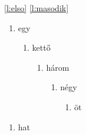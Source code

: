 \documentclass{article}
\begin{document}
\ref{l:elso}
\ref{l:masodik}

\begin{enumerate}
\item[\textbullet] egy
\label{l:elso}
\begin{enumerate}[label=\alph*]
\item kettő
\label{l:masodik}
\begin{enumerate}
\item három
\begin{enumerate}
\item négy
\begin{enumerate}
\item öt

\end{enumerate}
\end{enumerate}
\end{enumerate}
\end{enumerate}
\end{enumerate}
\hulipsum[1-4]
\begin{enumerate}[resume*]
\item hat
\end{enumerate}
\end{document}
